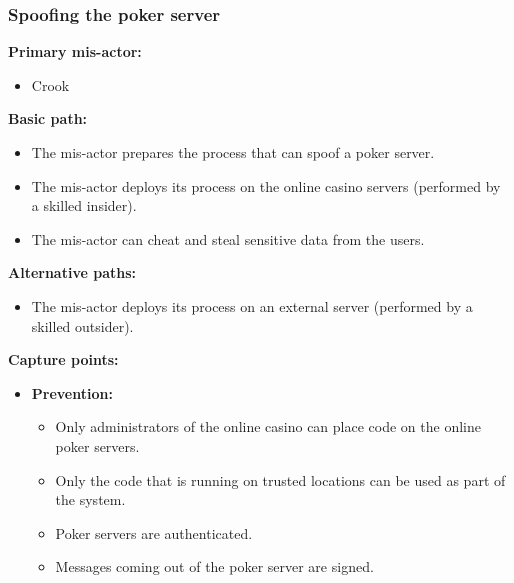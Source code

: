 \documentclass[a4paper,11pt]{report}
\begin{document}
\subsubsection{Spoofing the poker server}
\label{PokerServerCasesS}
\textbf{Primary mis-actor:}
\begin{itemize}
\item Crook
\end{itemize}
\textbf{Basic path:}
\begin{itemize}
\item The mis-actor prepares the process that can spoof a poker server.
\item The mis-actor deploys its process on the online casino servers (performed by a skilled insider).
\item The mis-actor can cheat and steal sensitive data from the users.
\end{itemize}
\textbf{Alternative paths:}
\begin{itemize}
\item The mis-actor deploys its process on an external server (performed by a skilled outsider).
\end{itemize}
\textbf{Capture points:}
\begin{itemize}
\item \textbf{Prevention:}
\begin{itemize}
\item Only administrators of the online casino can place code on the online poker servers.
\item Only the code that is running on trusted locations can be used as part of the system.
\item Poker servers are authenticated.
\item Messages coming out of the poker server are signed.
\end{itemize}
\end{itemize}
\end{document}
